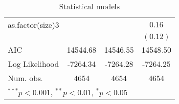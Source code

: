 \begin{table}
\begin{center}
\begin{tabular}{l c c c }
as.factor(size)3 &               &               & $0.16$        \\
                 &               &               & $(0.12)$      \\
\hline
AIC              & 14544.68      & 14546.55      & 14548.50      \\
Log Likelihood   & -7264.34      & -7264.28      & -7264.25      \\
Num. obs.        & 4654          & 4654          & 4654          \\
\hline
\multicolumn{4}{l}{\scriptsize{$^{***}p<0.001$, $^{**}p<0.01$, $^*p<0.05$}}
\end{tabular}
\caption{Statistical models}
\label{table:coefficients}
\end{center}
\end{table}
